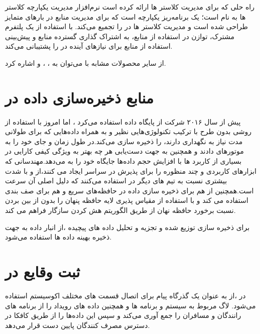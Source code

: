 راه حلی که  برای مدیریت کلاستر ها ارائه کرده است نرم‌افزار مدیریت یکپارچه کلاستر ها به نام  است\cite{resource_uber}؛  یک برنامه‌ریز یکپارچه است که برای مدیریت منابع در بارهای متمایز طراحی شده است و مدیریت کلاستر ها در  را تجمیع می‌کند.  با استفاده از یک پلتفرم مشترک، توازن در استفاده از منابع، به اشتراک گذاری گسترده منابع و پیش‌بینی استفاده از منابع برای نیازهای آینده در  را پشتیبانی می‌کند.

از سایر محصولات مشابه با  می‌توان به \cite{verma2015large} ،\cite{kubernetes} ، \cite{hadoop} و \cite{aurora}\cite{mesos} اشاره کرد.

\section{منابع ذخیره‌سازی داده در }
پیش از سال ۲۰۱۶ شرکت  از پایگاه داده  استفاده می‌کرد \cite{migration_postgres}، اما امروز با استفاده از روشی بدون طرح\cite{schemaless}  با ترکیب تکنولوژی‌هایی نظیر \cite{riak} و \cite{cassandra} به همراه  داده‌هایی که برای طولانی مدت نیاز به نگهداری دارند، را ذخیره سازی می‌کند.در طول زمان  و  جای خود را به موتور‌‌های  دادند و همچنین به جهت دست‌یابی هر چه بهتر به ویژگی کیفی کارایی در بسیاری از کاربرد ها با افزایش حجم داده‌ها  جایگاه خود را به  می‌دهد.مهندسانی که ابزارهای کاربردی و چند منظوره را برای پذیرش در سراسر  ایجاد می کنند،از  و  با شدت بیشتری نسبت به تیم های دیگر در  استفاده می‌کنند که دلیل اصلی آن سرعت است.همچنین  از \cite{redis} هم برای ذخیره سازی داده در حافظه‌های سریع و هم برای صف بندی استفاده می کند و با استفاده از \cite{Twemproxy} مقیاس پذیری لایه حافظه پنهان را بدون از بین بردن نسبت برخورد حافظه نهان از طریق الگوریتم هش کردن سازگار فراهم می کند.

برای ذخیره سازی توزیع شده و تجزیه و تحلیل داده های پیچیده ،از انبار داده \cite{hadoop} به جهت ذخیره بهینه داده ها استفاده می‌شود.

\section{ثبت وقایع در }
در ،از \cite{kafka} به عنوان یک گذرگاه پیام برای اتصال قسمت های مختلف اکوسیستم استفاده می‌شود. لاگ مربوط به سیستم و برنامه ها و همچنین داده های رویداد را از برنامه های رانندگان و مسافران را جمع آوری می‌کند و سپس این داده‌‌ها را از طریق کافکا در دسترس مصرف کنندگان پایین دست قرار می‌دهد.

